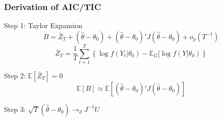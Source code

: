 \begin{frame}
  \frametitle{Derivation of AIC/TIC}
  \begin{block}{Step 1: Taylor Expansion}
    \vspace{-1em}
    \[B = \bar{Z}_T + (\widehat{\theta} - \theta_0) + (\widehat{\theta} - \theta_0)' J  (\widehat{\theta} - \theta_0) + o_p(T^{-1})\]
    \footnotesize
    \[\bar{Z}_T = \frac{1}{T} \sum_{t=1}^T \left\{ \log f(Y_t|\theta_0) - \mathbb{E}_G[\log f(Y|\theta_0) \right\}\]
  \end{block}

  \vspace{-1em}

  \pause

  \begin{block}{Step 2: $\mathbb{E}[\bar{Z}_T] = 0$}
    \vspace{-1.5em}
    \[\mathbb{E}[B] \approx \mathbb{E}\left[ (\widehat{\theta} - \theta_0)'J(\widehat{\theta} - \theta_0) \right]\]
  \end{block}

  \pause

  \begin{block}{Step 3: $\sqrt{T}(\widehat{\theta} - \theta_0) \rightarrow_d J^{-1}U$}
  \end{block}
\end{frame}
